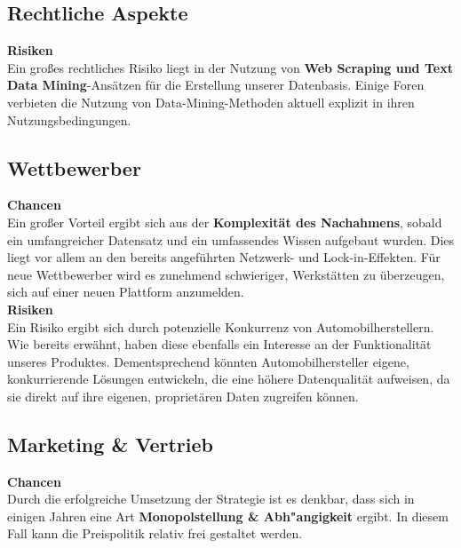 \subsection{Rechtliche Aspekte}
\textbf{Risiken} \\
Ein gro\ss es rechtliches Risiko liegt in der Nutzung von \textbf{Web Scraping und Text Data Mining}-Ans\"atzen f\"ur die Erstellung unserer Datenbasis. Einige Foren verbieten die Nutzung von Data-Mining-Methoden aktuell explizit in ihren Nutzungsbedingungen.


\subsection{Wettbewerber}
\textbf{Chancen} \\
Ein gro\ss er Vorteil ergibt sich aus der \textbf{Komplexit\"at des Nachahmens}, sobald ein umfangreicher Datensatz und ein umfassendes Wissen aufgebaut wurden. Dies liegt vor allem an den bereits angef\"uhrten Netzwerk- und Lock-in-Effekten. F\"ur neue Wettbewerber wird es zunehmend schwieriger, Werkst\"atten zu \"uberzeugen, sich auf einer neuen Plattform anzumelden. \\
\textbf{Risiken} \\
Ein Risiko ergibt sich durch potenzielle Konkurrenz von Automobilherstellern. Wie bereits erw\"ahnt, haben diese ebenfalls ein Interesse an der Funktionalit\"at unseres Produktes. Dementsprechend k\"onnten Automobilhersteller eigene, konkurrierende L\"osungen entwickeln, die eine h\"ohere Datenqualit\"at aufweisen, da sie direkt auf ihre eigenen, propriet\"aren Daten zugreifen k\"onnen. \\

\subsection{Marketing \& Vertrieb}
\textbf{Chancen} \\
Durch die erfolgreiche Umsetzung der Strategie ist es denkbar, dass sich in einigen Jahren eine Art \textbf{Monopolstellung \& Abh"angigkeit} ergibt. In diesem Fall kann die Preispolitik relativ frei gestaltet werden.

